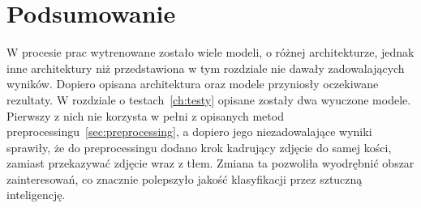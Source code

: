 \section{Podsumowanie}\label{sec:podsumowanie}

W procesie prac wytrenowane zostało wiele modeli, o różnej architekturze, jednak inne architektury niż przedstawiona w tym rozdziale nie dawały zadowalających wyników.
Dopiero opisana architektura oraz modele przyniosły oczekiwane rezultaty.
W rozdziale o testach~\ref{ch:testy} opisane zostały dwa wyuczone modele.
Pierwszy z nich nie korzysta w pełni z opisanych metod preprocessingu~\ref{sec:preprocessing}, a dopiero jego niezadowalające wyniki sprawiły,
że do preprocessingu dodano krok kadrujący zdjęcie do samej kości, zamiast przekazywać zdjęcie wraz z tłem.
Zmiana ta pozwoliła wyodrębnić obszar zainteresowań, co znacznie polepszyło jakość klasyfikacji przez sztuczną inteligencję.

